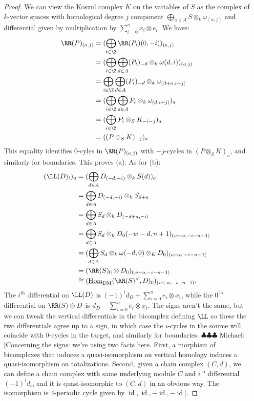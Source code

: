 \documentclass[12pt]{amsart}
\theoremstyle{definition}
\theoremstyle{remark}
\newcommand{\id}{\operatorname{id}}
\newcommand{\Hom}{\operatorname{Hom}} %
\newcommand{\michael}[1]{{\color{red} \sf $\clubsuit\clubsuit\clubsuit$ Michael: [#1]}}
\def\on{\operatorname}
\def\DM{\operatorname{DM}}
\def\th{\on{th}}
\def\o{\omega}
\begin{document}
\begin{proof}
We can view the Koszul complex $K$ on the variables of $S$ as the complex of $k$-vector spaces with homological degree $j$ component $\bigoplus_{a \in A} S \otimes_k \o_{(a, j)}$ and differential  given by multiplication by $\sum_{i = 0}^n x_i \otimes e_i$. We have:
\begin{align*}
\RR(P)_{(a, j)} &= (\bigoplus_{ i \in \Z} \RR(P_i)(0,-i))_{(a, j)} \\
& = (\bigoplus_{i \in \Z} \bigoplus_{d \in A} (P_i)_{-d} \otimes_k \o(d, i))_{(a, j)} \\ 
& = \bigoplus_{i \in \Z} \bigoplus_{d \in A} (P_i)_{-d} \otimes_k \o_{(d+a, i + j)} \\
& = (\bigoplus_{i \in \Z} \bigoplus_{d \in A} P_i \otimes_k \o_{(d,i + j)})_a \\
& = (\bigoplus_{ i \in \Z} P_i \otimes_S K_{- i - j})_a \\
& = ((P \otimes_S K)_{-j})_a
\end{align*}
This equality identifies 0-cyles in $\RR(P)_{(a, j)}$ with $-j$-cycles in $(P \otimes_S K)_a$, and similarly for boundaries. This proves (a). As for (b):
\begin{align*}
(\LL(D)_i)_a &= (\bigoplus_{d \in A} D_{(-d, -i)} \otimes_k S(d))_a\\
& = \bigoplus_{d \in A} D_{(-d, -i)} \otimes_k S_{d + a} \\
& = \bigoplus_{d \in A} S_{d} \otimes_k D_{(-d + a, -i)} \\
& =  \bigoplus_{d \in A} S_{d} \otimes_k D_0(-w - d , n +1)_{(w + a, -i - n - 1)} \\
& =  (\bigoplus_{d \in A} S_{d} \otimes_k \o(-d, 0) \otimes_E D_0)_{(w + a, -i - n - 1)} \\
&= (\RR(S)_0 \otimes D_0)_{(w + a, -i - n - 1)} \\
& \cong (\underline{\Hom}_{\DM}(\RR(S)^\vee, D)_0)_{(w + a, -i - n - 1)}.
\end{align*}
The $i^{\th}$ differential on $\LL(D)$ is $(-1)^i d_D + \sum_{i = 0}^n e_i \otimes x_i$, while the $0^{\th}$ differential on $\RR(S) \otimes D$ is  $d_D - \sum_{i = 0}^n e_i \otimes x_i$. The signs aren't the same, but we can tweak the vertical differentials in the bicomplex defining $\LL$ so these the two differentials agree up to a sign, in which case the $i$-cycles in the source will coincide with $0$-cycles in the target, and similarly for boundaries. 
\michael{Concerning the signs: we're using two facts here. First, a morphism of bicomplexes that induces a quasi-isomorphism on vertical homology induces a quasi-isomorphism on totalizations. Second, given a chain complex $(C, d)$, we can define a chain complex with same underlying module $C$ and $i^{\th}$ differential $(-1)^i d_i$, and it is quasi-isomorphic to $(C, d)$ in an obvious way. The isomorphism is 4-periodic cycle given by $\id, \id, -\id, -\id$}.
\end{proof}
\end{document}
